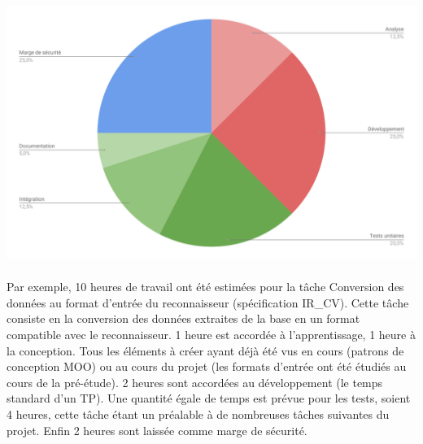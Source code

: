 \newpage

\begin{mdframed}[frametitle={Figure 1 : Diagramme de répartition du travail par tâche}, innerbottommargin=10]
\begin{center}
\includegraphics[scale=0.44]{repartition_travail_taches.pdf}
\end{center}
\end{mdframed}

\paragraph{}

\paragraph{}

Par exemple, 10 heures de travail ont été estimées pour la tâche Conversion des données au format d’entrée du reconnaisseur (spécification IR\_CV). Cette tâche consiste en la conversion des données extraites de la base en un format compatible avec le reconnaisseur. 1 heure est accordée à l’apprentissage, 1 heure à la conception. Tous les éléments à créer ayant déjà été vus en cours (patrons de conception MOO) ou au cours du projet (les formats d’entrée ont été étudiés au cours de la pré-étude). 2 heures sont accordées au développement (le temps standard d’un TP). Une quantité égale de temps est prévue pour les tests, soient 4 heures, cette tâche étant un préalable à de nombreuses tâches suivantes du projet. Enfin 2 heures sont laissée comme marge de sécurité.



